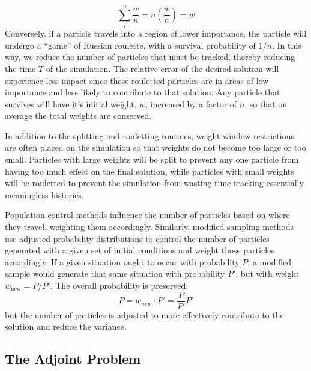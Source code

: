 \documentclass[10pt]{article}
\begin{document}
\begin{equation*}
\sum_{i}^{n}{\frac{w}{n}} = n\left(\frac{w}{n}\right) = w
\end{equation*}
%
Conversely, if a particle travels into a region of lower importance, the particle will undergo a ``game'' of Russian roulette, with a survival probability of $1/n$.
In this way, we reduce the number of particles that must be tracked, thereby reducing the time $T$ of the simulation.
The relative error of the desired solution will experience less impact since these rouletted particles are in areas of low importance and less likely to contribute to that solution.
Any particle that survives will have it's initial weight, $w$, increased by a factor of $n$, so that on average the total weights are conserved.

In addition to the splitting and rouletting routines, weight window restrictions are often placed on the simulation so that weights do not become too large or too small.
Particles with large weights will be split to prevent any one particle from having too much effect on the final solution, while particles with small weights will be rouletted to prevent the simulation from wasting time tracking essentially meaningless histories.

Population control methods influence the number of particles based on where they travel, weighting them accordingly.
Similarly, modified sampling methods use adjusted probability distributions to control the number of particles generated with a given set of initial conditions and weight those particles accordingly.
If a given situation ought to occur with probability $P$, a modified sample would generate that same situation with probability $P'$, but with weight $w_{\text{new}} = P/P'$.
The overall probability is preserved:
\begin{equation}
P = w_{new} \cdot P' = \frac{P}{P'}P'
\label{eq:prob-preserved}
\end{equation}
but the number of particles is adjusted to more effectively contribute to the solution and reduce the variance.



\subsection{The Adjoint Problem}
\label{sec:math:adjoint}
\end{document}

